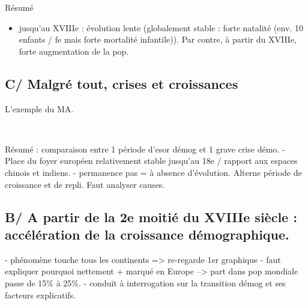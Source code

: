 \documentclass{beamer}
\begin{document}
\begin{frame}{Résumé}
\begin{itemize}
\item jusqu'au XVIIIe : évolution lente (globalement stable : forte natalité (env. 10 enfants / fe mais forte mortalité infantile)). Par contre, à partir du XVIIIe, forte augmentation de la pop.
\end{itemize}

\end{frame}

\subsection{C/ Malgré tout, crises et croissances}

\begin{frame}{L'exemple du MA.}

 \\

\end{frame}

\begin{frame}
\end{frame}

\begin{frame}{Résumé : comparaison entre 1 période d'esor démog et 1 grave crise démo.}
- Place du foyer européen relativement stable jusqu'au 18e / rapport aux espaces chinois et indiens.
- permanence pas = à absence d'évolution. Alterne période de croissance et de repli.  Faut analyser causes.
\end{frame}


\subsection{B/ A partir de la 2e moitié du XVIIIe siècle : accélération de la croissance démographique.}

\begin{frame}
- phénomène touche tous les continents => re-regarde 1er graphique
- faut expliquer pourquoi nettement + marqué en Europe --> part dans pop mondiale passe de 15\% à 25\%. 
- conduit à interrogation sur la transition démog et ses facteurs explicatifs.
\end{frame}
\end{document}
